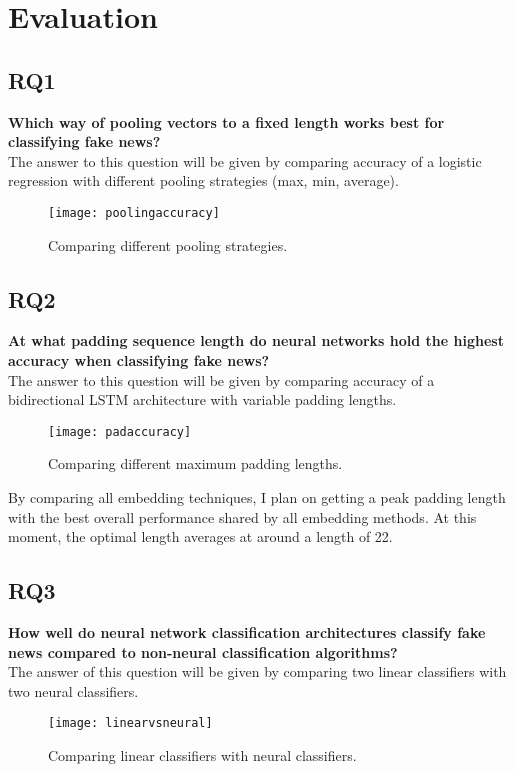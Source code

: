\section{Evaluation}

\subsection{RQ1}
\textbf{Which way of pooling vectors to a fixed length works best for classifying fake news?}\\
The answer to this question will be given by comparing accuracy of a logistic regression with different pooling strategies (max, min, average).

\begin{figure}[h]
    \centering
    \texttt{[image: poolingaccuracy]}
    \caption{Comparing different pooling strategies.}
\end{figure}

\subsection{RQ2}
\textbf{At what padding sequence length do neural networks hold the highest accuracy when classifying fake news?}\\
The answer to this question will be given by comparing accuracy of a bidirectional LSTM architecture with variable padding lengths.

\begin{figure}[h]
    \centering
    \texttt{[image: padaccuracy]}
    \caption{Comparing different maximum padding lengths.}
\end{figure}

By comparing all embedding techniques, I plan on getting a peak padding length with the best overall performance shared by all embedding methods. 
At this moment, the optimal length averages at around a length of 22. 

\subsection{RQ3}
\textbf{How well do neural network classification architectures classify fake news compared to non-neural classification algorithms?}\\
The answer of this question will be given by comparing two linear classifiers with two neural classifiers. 

\begin{figure}[h]
    \centering
    \texttt{[image: linearvsneural]}
    \caption{Comparing linear classifiers with neural classifiers.}
\end{figure}

\pagebreak